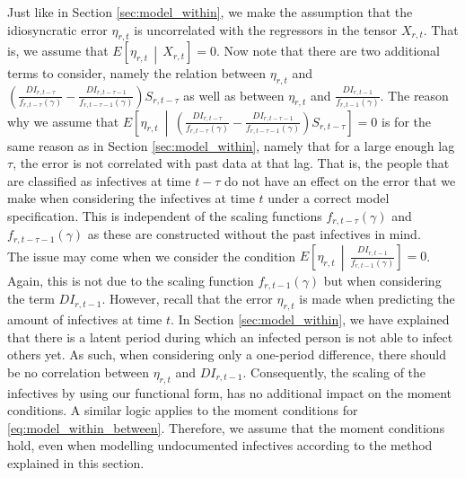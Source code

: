 \documentclass[12pt]{article}
\begin{document}
	Just like in Section \ref{sec:model_within}, we make the assumption that the idiosyncratic error $\eta_{r,t}$ is uncorrelated with the regressors in the tensor $X_{r,t}$. That is, we assume that $E\left[\eta_{r,t} \,\middle|\, X_{r,t}\right] = 0$. Now note that there are two additional terms to consider, namely the relation between $\eta_{r,t}$ and $\left(\frac{DI_{r,t-\tau}}{f_{r,t-\tau}(\gamma)} - \frac{DI_{r,t-\tau-1}}{f_{r,t-\tau-1}(\gamma)}\right)S_{r,t-\tau}$ as well as between $\eta_{r,t}$ and $\frac{DI_{r,t-1}}{f_{r,t-1}(\gamma)}$. The reason why we assume that $E\left[\eta_{r,t} ~\middle|\, \left(\frac{DI_{r,t-\tau}}{f_{r,t-\tau}(\gamma)} - \frac{DI_{r,t-\tau-1}}{f_{r,t-\tau-1}(\gamma)}\right)S_{r,t-\tau}\right] = 0$ is for the same reason as in Section \ref{sec:model_within}, namely that for a large enough lag $\tau$, the error is not correlated with past data at that lag. That is, the people that are classified as infectives at time $t-\tau$ do not have an effect on the error that we make when considering the infectives at time $t$ under a correct model specification. This is independent of the scaling functions $f_{r,t-\tau}(\gamma)$ and $f_{r,t-\tau-1}(\gamma)$ as these are constructed without the past infectives in mind. \\
	
	The issue may come when we consider the condition $E\left[\eta_{r,t} \,\middle|\,  \frac{DI_{r,t-1}}{f_{r,t-1}(\gamma)}\right] = 0$. Again, this is not due to the scaling function $f_{r,t-1}(\gamma)$ but when considering the term $DI_{r,t-1}$. However, recall that the error $\eta_{r,t}$ is made when predicting the amount of infectives at time $t$. In Section \ref{sec:model_within}, we have explained that there is a latent period during which an infected person is not able to infect others yet. As such, when considering only a one-period difference, there should be no correlation between $\eta_{r,t}$ and $DI_{r,t-1}$. Consequently, the scaling of the infectives by using our functional form, has no additional impact on the moment conditions. A similar logic applies to the moment conditions for \eqref{eq:model_within_between}. Therefore, we assume that the moment conditions hold, even when modelling undocumented infectives according to the method explained in this section. 
	
	\newpage
\end{document}
